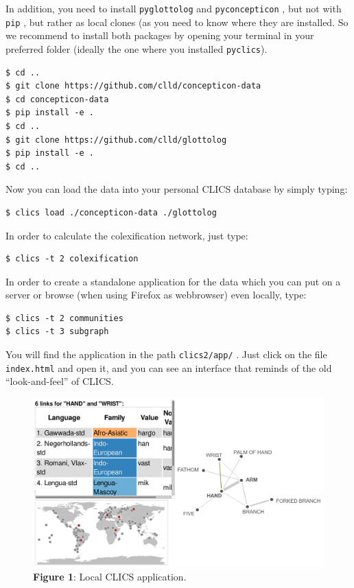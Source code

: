 \documentclass[
  a4paper,
  14pt,
  oneside,
  tablecaptionabove
]{scrbook}
\begin{document}
In addition, you need to install \lstinline!pyglottolog! and
\lstinline!pyconcepticon! , but not with \lstinline!pip! , but rather as
local clones (as you need to know where they are installed. So we
recommend to install both packages by opening your terminal in your
preferred folder (ideally the one where you installed
\lstinline!pyclics!).

\begin{lstlisting}[basicstyle=\small]
$ cd ..
$ git clone https://github.com/clld/concepticon-data
$ cd concepticon-data
$ pip install -e .
$ cd ..
$ git clone https://github.com/clld/glottolog
$ pip install -e .
$ cd ..
\end{lstlisting}

Now you can load the data into your personal CLICS database by simply
typing:

\begin{lstlisting}[basicstyle=\small]
$ clics load ./concepticon-data ./glottolog
\end{lstlisting}

In order to calculate the colexification network, just type:

\begin{lstlisting}[basicstyle=\small]
$ clics -t 2 colexification
\end{lstlisting}

In order to create a standalone application for the data which you can
put on a server or browse (when using Firefox as webbrowser) even
locally, type:

\begin{lstlisting}[basicstyle=\small]
$ clics -t 2 communities
$ clics -t 3 subgraph
\end{lstlisting}

You will find the application in the path \lstinline!clics2/app/! . Just
click on the file \lstinline!index.html! and open it, and you can see an
interface that reminds of the old \enquote{look-and-feel} of CLICS.

\begin{figure}[htb]
\centering
\includegraphics[width=\textwidth]{images/clics-local.png}
\caption*{\small \textbf{Figure 1}: Local CLICS application.}
\end{figure}
\end{document}
